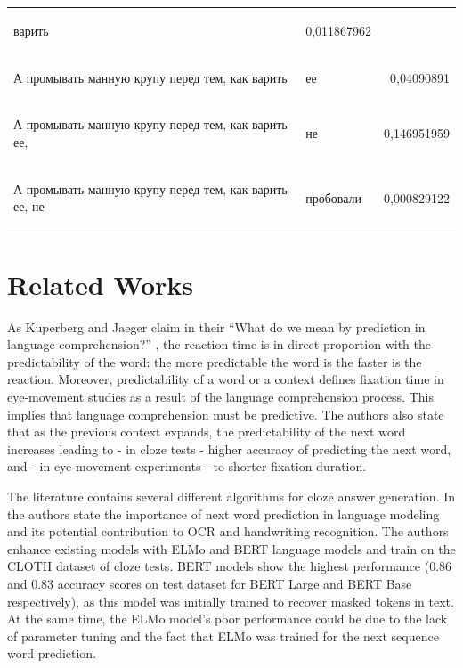 \documentclass[a4paper]{article}
\begin{document}
\begin{table}
\begin{tabular}{llr}
\begin{russian} варить \end{russian} &
0,011867962 \\
\begin{russian} А промывать манную крупу перед тем‚ как варить \end{russian} &
\begin{russian} ее \end{russian} &
0,04090891 \\
\begin{russian} А промывать манную крупу перед тем‚ как варить ее‚ \end{russian} &
\begin{russian} не \end{russian} &
0,146951959 \\
\begin{russian} А промывать манную крупу перед тем‚ как варить ее‚ не \end{russian} &
\begin{russian} пробовали \end{russian} &
0,000829122 \\
\end{tabular}
\end{table}

\section{Related Works}

As Kuperberg and Jaeger claim in their “What do we mean by prediction in language comprehension?” \cite{kuperberg-jaeger}, the reaction time is in direct proportion with the predictability of the word: the more predictable the word is the faster is the reaction. Moreover, predictability of a word or a context defines fixation time in eye-movement studies as a result of the language comprehension process. This implies that language comprehension must be predictive. The authors also state that as the previous context expands, the predictability of the next word increases leading to - in cloze tests - higher accuracy of predicting the next word, and - in eye-movement experiments - to shorter fixation duration.

The literature contains several different algorithms for cloze answer generation. In \cite{zhou-cloze} the authors state the importance of next word prediction in language modeling and its potential contribution to OCR and handwriting recognition. The authors enhance existing models with ELMo and BERT language models and train on the CLOTH dataset of cloze tests. BERT models show the highest performance (0.86 and 0.83 accuracy scores on test dataset for BERT Large and BERT Base respectively), as this model was initially trained to recover masked tokens in text. At the same time, the ELMo model's poor performance could be due to the lack of parameter tuning and the fact that ELMo was trained for the next sequence word prediction.
\end{document}
